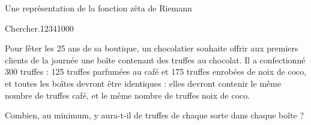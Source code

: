 {\begin{His}
\begin{minipage}[b]{0.4\textwidth}
\begin{center}
  Une représentation de la fonction zêta de Riemann

\end{center}
\end{minipage}

\end{His}

 

\begin{ExoDec}{Chercher.}{1234}{1}{0}{0}{0}

Pour fêter les 25 ans de sa boutique, un chocolatier souhaite offrir aux premiers clients de la journée une boîte contenant des truffes au chocolat.
Il a confectionné 300 truffes : 125 truffes parfumées au café et 175 truffes enrobées de noix de coco, et toutes les boîtes devront être identiques : elles
devront contenir le même nombre de truffes café, et le même nombre
de truffes noix de coco.

Combien, au minimum,  y aura-t-il de truffes de chaque sorte dans chaque boîte ?
 
\end{ExoDec}



}

